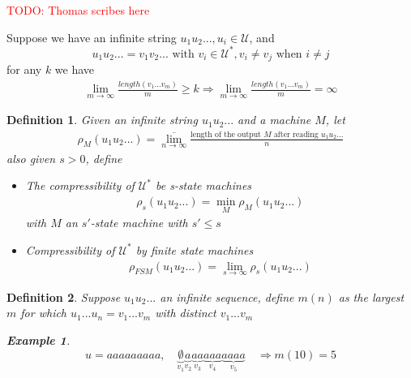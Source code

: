 \documentclass{article}
\newtheorem{definition}{Definition}[section]
\theoremstyle{definition} %
\newtheorem{example}{Example}
\newcommand{\todo}[1]{\textcolor{red}{TODO: #1}}
\def\U{\mathcal{U}}
\begin{document}










\todo{Thomas scribes here}


Suppose we have an infinite string $u_1 u_2 ..., u_i \in \U$, and
$$u_1 u_2 ... = v_1 v_2 ... \text{ with } v_i \in \U^*, v_i \neq v_j \text{ when } i \neq j$$
for any $k$ we have
\begin{align*}
  \lim_{m \to \infty} \frac{length(v_1...v_m)}{m} \geq k
  \Rightarrow \lim_{m \to \infty} \frac{length(v_1 ... v_m)}{m} =
  \infty
\end{align*}

\begin{definition}
  Given an infinite string $u_1 u_2 ...$ and a machine $M$, let
  \begin{align*}
    \rho_{M}(u_1 u_2 ...) = \overline{\lim_{n \to \infty}} \frac{\text{length of the output } M \text{ after reading } u_1 u_2...}{n}
  \end{align*}
  also given $s > 0$, define
  \begin{itemize}
    \item The compressibility of $\U^*$ be s-state machines
    \begin{align*}
      \rho_s (u_1 u_2 ...) = \min_{M} \rho_{M}(u_1 u_2 ...)
    \end{align*}
    with $M$ an $s'$-state machine with $s' \leq s$
    \item Compressibility of $\U^*$ by finite state machines
    \begin{align*}
      \rho_{FSM} (u_1 u_2 ...) = \lim_{s \to \infty} \rho_s (u_1 u_2 ...)
    \end{align*}
  \end{itemize}
\end{definition}

\begin{definition}
  Suppose $u_1 u_2 ...$ an infinite sequence, define $m(n)$ as the largest $m$ for which $u_1 ... u_n = v_1 ... v_m$ with distinct $v_1 ... v_m$
  \begin{example}
    $$ u = aaaaaaaaa, \quad \underbrace{\emptyset}_{v_1} \underbrace{a}_{v_2} \underbrace{aa}_{v_3} \underbrace{aaa}_{v_4} \underbrace{aaaa}_{v_5} \quad \Rightarrow m(10) = 5 $$
  \end{example}
\end{definition}
\end{document}
